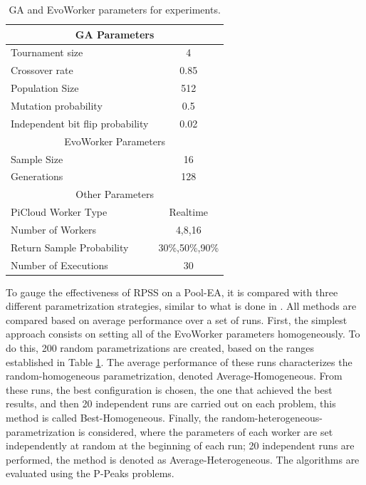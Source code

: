 \begin{table}[t]
\renewcommand{\arraystretch}{1.3}
\caption{GA and EvoWorker parameters for experiments.}
\label{tab:params}
\centering
\begin{tabular}{|l|c|}
\hline
\multicolumn{2}{|c|}{GA Parameters} \\
\hline
Tournament size & 4 \\
Crossover rate & 0.85  \\
Population Size & 512 \\
Mutation probability & 0.5 \\
Independent bit flip probability  & 0.02 \\
\hline
\multicolumn{2}{|c|}{EvoWorker Parameters} \\
\hline
Sample Size & 16 \\
Generations & 128 \\
\hline
\multicolumn{2}{|c|}{Other Parameters} \\
\hline
PiCloud Worker Type & Realtime \\
Number of Workers & 4,8,16 \\
Return Sample Probability & 30\%,50\%,90\% \\
Number of Executions & 30 \\

\hline

\end{tabular}
\end{table}

To gauge the effectiveness of RPSS on a Pool-EA, it is compared with three different parametrization strategies, similar to what is done in \cite{fuku1,fuku2}.
All methods are compared based on average performance over a set of runs.
First, the simplest approach consists on setting all of the EvoWorker parameters homogeneously.
To do this, 200 random parametrizations are created, based on the ranges established in Table \ref{tab:params}.
The average performance of these runs characterizes the random-homogeneous parametrization, denoted Average-Homogeneous.
From these runs, the best configuration is chosen, the one that achieved the best results,
and then 20 independent runs are carried out on each problem, this method is called Best-Homogeneous.
Finally, the random-heterogeneous-parametrization is considered, where the parameters of each worker are set independently at random at
the beginning of each run; 20 independent runs are performed, the method is denoted as Average-Heterogeneous.
The algorithms are evaluated using the P-Peaks problems.

